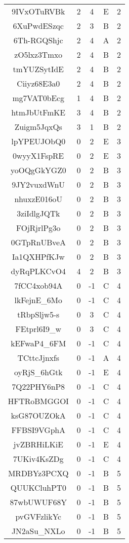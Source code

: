 \documentclass[manuscript,screen,review]{acmart}
\begin{document}
\begin{longtable}{|c|c|c|c|c|}
9IVxOTuRVBk & 2 & 4 & E & 2 \\
6XuPwdESzqc & 2 & 3 & B & 2 \\
6Th-RGQShjc & 2 & 4 & A & 2 \\
zO5lxz3Tmxo & 2 & 4 & B & 2 \\
tmYUZSytIdE & 2 & 4 & B & 2 \\
Ciiyz68E3a0 & 2 & 4 & B & 2 \\
mg7VAT0bEcg & 1 & 4 & B & 2 \\
htmJbUtFmKE & 3 & 4 & B & 2 \\
Zuigm5JqxQs & 3 & 1 & B & 2 \\
lpYPEUJObQ0 & 0 & 2 & E & 3 \\
0wyyX1FspRE & 0 & 2 & E & 3 \\
yoOQgGkYGZ0 & 0 & 2 & B & 3 \\
9JY2vuxdWnU & 0 & 2 & B & 3 \\
nhuxzE016oU & 0 & 2 & B & 3 \\
3ziIdlgJQTk & 0 & 2 & B & 3 \\
FOjRjrlPg3o & 0 & 2 & B & 3 \\
0GTpRnUBveA & 0 & 2 & B & 3 \\
Ia1QXHPfKJw & 0 & 2 & B & 3 \\
dyRqPLKCvO4 & 4 & 2 & B & 3 \\
7fCC4xob94A & 0 & -1 & C & 4 \\
lkFejnE\_6Mo & 0 & -1 & C & 4 \\
tRbpSljw5-s & 0 & 3 & C & 4 \\
FEtprl6I9\_w & 0 & 3 & C & 4 \\
kEFwaP4\_6FM & 0 & -1 & C & 4 \\
TCttcJjnxfs & 0 & -1 & A & 4 \\
oyRjS\_6hGtk & 0 & -1 & E & 4 \\
7Q22PHY6nP8 & 0 & -1 & C & 4 \\
HFTRoBMGGOI & 0 & -1 & C & 4 \\
ksG87OUZOkA & 0 & -1 & C & 4 \\
FFBSI9VGphA & 0 & -1 & C & 4 \\
jvZBRHiLKiE & 0 & -1 & E & 4 \\
7UKiv4KsZDg & 0 & -1 & C & 4 \\
MRDBYz3PCXQ & 0 & -1 & B & 5 \\
QUUKCluhPT0 & 0 & -1 & B & 5 \\
87wbUWUF68Y & 0 & -1 & B & 5 \\
pvGVFzlikYc & 0 & -1 & B & 5 \\
JN2aSu\_NXLo & 0 & -1 & B & 5 \\

\end{longtable}
\end{document}
